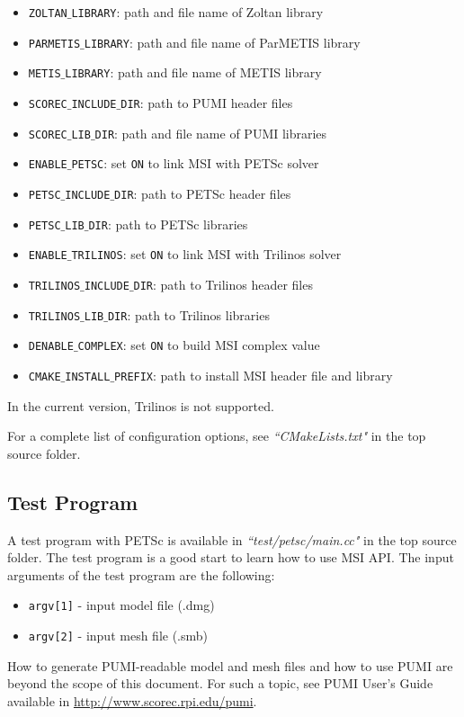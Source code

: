 \documentclass[11pt]{article}  %
\begin{document}
\begin{itemize}
\item \texttt{ZOLTAN$\_$LIBRARY}: path and file name of Zoltan library
\item \texttt{PARMETIS$\_$LIBRARY}: path and file name of ParMETIS library
\item \texttt{METIS$\_$LIBRARY}: path and file name of METIS library
\item \texttt{SCOREC$\_$INCLUDE$\_$DIR}: path to PUMI header files
\item \texttt{SCOREC$\_$LIB$\_$DIR}: path and file name of PUMI libraries
\item \texttt{ENABLE$\_$PETSC}: set \texttt{ON} to link MSI with PETSc solver
\item \texttt{PETSC$\_$INCLUDE$\_$DIR}: path to PETSc header files
\item \texttt{PETSC$\_$LIB$\_$DIR}: path to PETSc libraries
\item \texttt{ENABLE$\_$TRILINOS}: set \texttt{ON} to link MSI with Trilinos solver
\item \texttt{TRILINOS$\_$INCLUDE$\_$DIR}: path to Trilinos header files
\item \texttt{TRILINOS$\_$LIB$\_$DIR}: path to Trilinos libraries
\item \texttt{DENABLE$\_$COMPLEX}: set \texttt{ON} to build MSI complex value
\item \texttt{CMAKE$\_$INSTALL$\_$PREFIX}: path to install MSI header file and library
\end{itemize}

In the current version, Trilinos is not supported.

For a complete list of configuration options, see \emph{``CMakeLists.txt"} in the top source folder. 

\subsection{Test Program}
A test program with PETSc is available in \emph{``test/petsc/main.cc"} in the top source folder.
The test program is a good start to learn how to use MSI API. The input arguments of the test program are the following:
\begin{itemize}
\item \texttt{argv[1]} - input model file (.dmg)
\item \texttt{argv[2]} - input mesh file (.smb)
\end{itemize}

How to generate PUMI-readable model and mesh files and how to use PUMI are beyond the scope of this document. For such a topic, see PUMI User's Guide available in \url{http://www.scorec.rpi.edu/pumi}.



\end{document}
